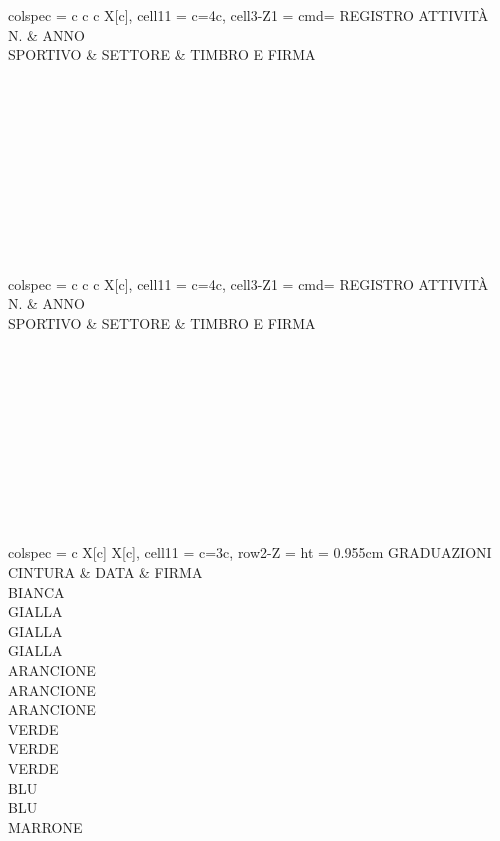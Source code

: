 \documentclass[
    twoside,
    10pt
]{book}
\begin{document}
    \newpage

    \newcommand{\athlete}[1]{
        \begin{hhtable}{
            colspec = {c c c X[c]},
            cell{1}{1} = {c=4}{c},
            cell{3-Z}{1} = {cmd=\inteval{\value{rownum}-2+#1}}
        }
            REGISTRO ATTIVITÀ \\
            N. & {ANNO\\SPORTIVO} & SETTORE & TIMBRO E FIRMA \\ \\ \\ \\ \\ \\ \\ \\ \\ \\ \\
        \end{hhtable}
    }

    \newpage
    \athlete{0}
    
    \newpage
    \athlete{10}

    \newpage
    \begin{hhtable}{
        colspec = {c X[c] X[c]},
        cell{1}{1} = {c=3}{c},
        row{2-Z} = {
            ht = 0.955cm
        }
    }
        GRADUAZIONI \\
        CINTURA & DATA & FIRMA \\
        {BIANCA\\GIALLA} \\
        GIALLA \\
        {GIALLA\\ARANCIONE} \\
        ARANCIONE \\
        {ARANCIONE\\VERDE} \\
        VERDE \\
        {VERDE\\BLU} \\
        BLU \\
        MARRONE
    \end{hhtable}
    
\end{document}
